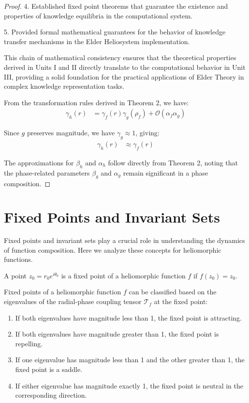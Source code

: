 \begin{proof}
4. Established fixed point theorems that guarantee the existence and properties of knowledge equilibria in the computational system.

5. Provided formal mathematical guarantees for the behavior of knowledge transfer mechanisms in the Elder Heliosystem implementation.

This chain of mathematical consistency ensures that the theoretical properties derived in Units I and II directly translate to the computational behavior in Unit III, providing a solid foundation for the practical applications of Elder Theory in complex knowledge representation tasks.

From the transformation rules derived in Theorem 2, we have:
\begin{align}
\gamma_h(r) &= \gamma_f(r)\gamma_g(\rho_f) + \mathcal{O}(\alpha_f\alpha_g)
\end{align}

Since $g$ preserves magnitude, we have $\gamma_g \approx 1$, giving:
\begin{align}
\gamma_h(r) &\approx \gamma_f(r)
\end{align}

The approximations for $\beta_h$ and $\alpha_h$ follow directly from Theorem 2, noting that the phase-related parameters $\beta_g$ and $\alpha_g$ remain significant in a phase composition.
\end{proof}

\section{Fixed Points and Invariant Sets}

Fixed points and invariant sets play a crucial role in understanding the dynamics of function composition. Here we analyze these concepts for heliomorphic functions.

\begin{definition}
A point $z_0 = r_0e^{i\theta_0}$ is a fixed point of a heliomorphic function $f$ if $f(z_0) = z_0$.
\end{definition}

\begin{theorem}
Fixed points of a heliomorphic function $f$ can be classified based on the eigenvalues of the radial-phase coupling tensor $\mathcal{T}_f$ at the fixed point:
\begin{enumerate}
    \item If both eigenvalues have magnitude less than 1, the fixed point is attracting.
    \item If both eigenvalues have magnitude greater than 1, the fixed point is repelling.
    \item If one eigenvalue has magnitude less than 1 and the other greater than 1, the fixed point is a saddle.
    \item If either eigenvalue has magnitude exactly 1, the fixed point is neutral in the corresponding direction.
\end{enumerate}
\end{theorem}

